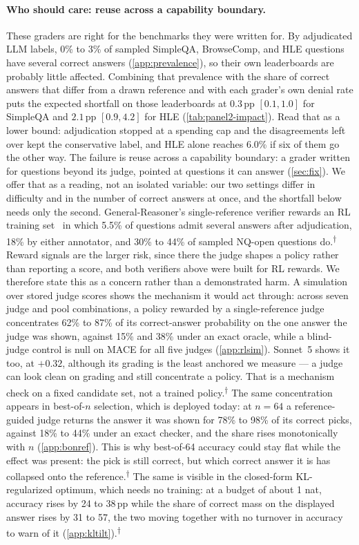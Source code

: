 \documentclass{article}
\newcommand{\ci}[2]{{\scriptsize$[#1,#2]$}}
\newcommand{\ph}{\textsuperscript{$\dagger$}}
\begin{document}
\paragraph{Who should care: reuse across a capability boundary.}
These graders are right for the benchmarks they were written for.
By adjudicated LLM labels, 0\% to 3\% of sampled SimpleQA, BrowseComp, and HLE questions have several correct answers (\cref{app:prevalence}), so their own leaderboards are probably little affected. Combining that prevalence with the share of correct answers that differ from a drawn reference and with each grader's own denial rate puts the expected shortfall on those leaderboards at $0.3$\,pp \ci{0.1}{1.0} for SimpleQA and $2.1$\,pp \ci{0.9}{4.2} for HLE (\cref{tab:panel2-impact}). Read that as a lower bound: adjudication stopped at a spending cap and the disagreements left over kept the conservative label, and HLE alone reaches 6.0\% if six of them go the other way.
The failure is reuse across a capability boundary: a grader written for questions beyond its judge, pointed at questions it can answer (\cref{sec:fix}). We offer that as a reading, not an isolated variable: our two settings differ in difficulty and in the number of correct answers at once, and the shortfall below needs only the second.
General-Reasoner's single-reference verifier rewards an RL training set~\citep{ma2025generalreasoner} in which 5.5\% of questions admit several answers after adjudication, 18\% by either annotator, and 30\% to 44\% of sampled NQ-open questions do.\ph{}
Reward signals are the larger risk, since there the judge shapes a policy rather than reporting a score, and both verifiers above were built for RL rewards.
We therefore state this as a concern rather than a demonstrated harm. A simulation over stored judge scores shows the mechanism it would act through: across seven judge and pool combinations, a policy rewarded by a single-reference judge concentrates 62\% to 87\% of its correct-answer probability on the one answer the judge was shown, against 15\% and 38\% under an exact oracle, while a blind-judge control is null on \textsc{MACE} for all five judges (\cref{app:rlsim}). Sonnet~5 shows it too, at $+0.32$, although its grading is the least anchored we measure --- a judge can look clean on grading and still concentrate a policy. That is a mechanism check on a fixed candidate set, not a trained policy.\ph{} The same concentration appears in best-of-$n$ selection, which is deployed today: at $n{=}64$ a reference-guided judge returns the answer it was shown for 78\% to 98\% of its correct picks, against 18\% to 44\% under an exact checker, and the share rises monotonically with $n$ (\cref{app:bonref}). This is why best-of-64 accuracy could stay flat while the effect was present: the pick is still correct, but which correct answer it is has collapsed onto the reference.\ph{} The same is visible in the closed-form KL-regularized optimum, which needs no training: at a budget of about 1 nat, accuracy rises by 24 to 38\,pp while the share of correct mass on the displayed answer rises by 31 to 57, the two moving together with no turnover in accuracy to warn of it (\cref{app:kltilt}).\ph{}
\end{document}

